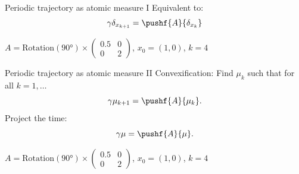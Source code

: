\documentclass{beamer}
\begin{document}
  \begin{frame}{Periodic trajectory as atomic measure I}
    Equivalent to:
    \[ \gamma \delta_{x_{k+1}} = \pushf{A}{\delta_{x_k}} \]

    \begin{example}
      \vspace{-1em}
      $A = \text{Rotation}(\ang{90}) \times \begin{pmatrix}0.5 & 0\\0 & 2\end{pmatrix}$,
      $x_0 = (1, 0)$, $k = 4$
      \vspace{-1em}
      \begin{center}
      \end{center}
    \end{example}
  \end{frame}

  \begin{frame}{Periodic trajectory as atomic measure II}
    \alert{Convex}ification: Find $\mu_{k}$ such that for all $k = 1, \ldots$
    \[ \gamma \mu_{k+1} = \pushf{A}{\mu_k}. \]
    Project the time:
    \[ \gamma \mu = \pushf{A}{\mu}. \]

    \begin{example}
      \vspace{-1em}
      $A = \text{Rotation}(\ang{90}) \times \begin{pmatrix}0.5 & 0\\0 & 2\end{pmatrix}$,
      $x_0 = (1, 0)$, $k = 4$
      \vspace{-1em}
      \begin{center}
      \end{center}
    \end{example}
  \end{frame}
\end{document}
